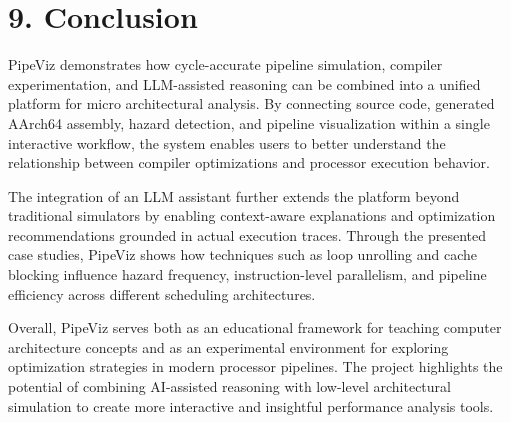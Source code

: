 \section*{9. Conclusion}
PipeViz demonstrates how cycle-accurate pipeline simulation, compiler experimentation, and LLM-assisted reasoning can be combined into a unified platform for micro architectural analysis. By connecting source code, generated AArch64 assembly, hazard detection, and pipeline visualization within a single interactive workflow, the system enables users to better understand the relationship between compiler optimizations and processor execution behavior.

The integration of an LLM assistant further extends the platform beyond traditional simulators by enabling context-aware explanations and optimization recommendations grounded in actual execution traces. Through the presented case studies, PipeViz shows how techniques such as loop unrolling and cache blocking influence hazard frequency, instruction-level parallelism, and pipeline efficiency across different scheduling architectures.

Overall, PipeViz serves both as an educational framework for teaching computer architecture concepts and as an experimental environment for exploring optimization strategies in modern processor pipelines. The project highlights the potential of combining AI-assisted reasoning with low-level architectural simulation to create more interactive and insightful performance analysis tools.